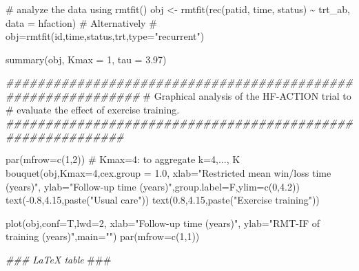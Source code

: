 \documentclass[
  letterpaper,
  DIV=11,
  numbers=noendperiod]{scrreprt}
\newenvironment{Shaded}{\begin{snugshade}}{\end{snugshade}}
\newcommand{\AlertTok}[1]{\textcolor[rgb]{0.68,0.00,0.00}{#1}}
\newcommand{\AttributeTok}[1]{\textcolor[rgb]{0.40,0.45,0.13}{#1}}
\newcommand{\CommentTok}[1]{\textcolor[rgb]{0.37,0.37,0.37}{#1}}
\newcommand{\DecValTok}[1]{\textcolor[rgb]{0.68,0.00,0.00}{#1}}
\newcommand{\DocumentationTok}[1]{\textcolor[rgb]{0.37,0.37,0.37}{\textit{#1}}}
\newcommand{\FloatTok}[1]{\textcolor[rgb]{0.68,0.00,0.00}{#1}}
\newcommand{\FunctionTok}[1]{\textcolor[rgb]{0.28,0.35,0.67}{#1}}
\newcommand{\NormalTok}[1]{\textcolor[rgb]{0.00,0.23,0.31}{#1}}
\newcommand{\OtherTok}[1]{\textcolor[rgb]{0.00,0.23,0.31}{#1}}
\newcommand{\SpecialCharTok}[1]{\textcolor[rgb]{0.37,0.37,0.37}{#1}}
\newcommand{\StringTok}[1]{\textcolor[rgb]{0.13,0.47,0.30}{#1}}
\begin{document}
\begin{Shaded}
\begin{Highlighting}[]
\CommentTok{\# analyze the data using rmtfit()}
\NormalTok{obj }\OtherTok{\textless{}{-}} \FunctionTok{rmtfit}\NormalTok{(}\FunctionTok{rec}\NormalTok{(patid, time, status) }\SpecialCharTok{\textasciitilde{}}\NormalTok{ trt\_ab, }\AttributeTok{data =}\NormalTok{ hfaction)}
\CommentTok{\# Alternatively}
\CommentTok{\# obj=rmtfit(id,time,status,trt,type="recurrent")}

\FunctionTok{summary}\NormalTok{(obj, }\AttributeTok{Kmax =} \DecValTok{1}\NormalTok{, }\AttributeTok{tau =} \FloatTok{3.97}\NormalTok{)}

\DocumentationTok{\#\#\#\#\#\#\#\#\#\#\#\#\#\#\#\#\#\#\#\#\#\#\#\#\#\#\#\#\#\#\#\#\#\#\#\#\#\#\#\#\#\#\#\#\#\#\#\#\#\#\#\#\#\#\#\#\#\#\#\#\#}
\CommentTok{\# Graphical analysis of the HF{-}ACTION trial to}
\CommentTok{\# evaluate the effect of exercise training.}
\DocumentationTok{\#\#\#\#\#\#\#\#\#\#\#\#\#\#\#\#\#\#\#\#\#\#\#\#\#\#\#\#\#\#\#\#\#\#\#\#\#\#\#\#\#\#\#\#\#\#\#\#\#\#\#\#\#\#\#\#\#\#\#}

\FunctionTok{par}\NormalTok{(}\AttributeTok{mfrow=}\FunctionTok{c}\NormalTok{(}\DecValTok{1}\NormalTok{,}\DecValTok{2}\NormalTok{))}
\CommentTok{\# Kmax=4: to aggregate k=4,..., K}
\FunctionTok{bouquet}\NormalTok{(obj,}\AttributeTok{Kmax=}\DecValTok{4}\NormalTok{,}\AttributeTok{cex.group =} \FloatTok{1.0}\NormalTok{,}
        \AttributeTok{xlab=}\StringTok{"Restricted mean win/loss time (years)"}\NormalTok{,}
        \AttributeTok{ylab=}\StringTok{"Follow{-}up time (years)"}\NormalTok{,}\AttributeTok{group.label=}\NormalTok{F,}\AttributeTok{ylim=}\FunctionTok{c}\NormalTok{(}\DecValTok{0}\NormalTok{,}\FloatTok{4.2}\NormalTok{))}
\FunctionTok{text}\NormalTok{(}\SpecialCharTok{{-}}\FloatTok{0.8}\NormalTok{,}\FloatTok{4.15}\NormalTok{,}\FunctionTok{paste}\NormalTok{(}\StringTok{"Usual care"}\NormalTok{))}
\FunctionTok{text}\NormalTok{(}\FloatTok{0.8}\NormalTok{,}\FloatTok{4.15}\NormalTok{,}\FunctionTok{paste}\NormalTok{(}\StringTok{"Exercise training"}\NormalTok{))}

\FunctionTok{plot}\NormalTok{(obj,}\AttributeTok{conf=}\NormalTok{T,}\AttributeTok{lwd=}\DecValTok{2}\NormalTok{, }\AttributeTok{xlab=}\StringTok{"Follow{-}up time (years)"}\NormalTok{,}
     \AttributeTok{ylab=}\StringTok{"RMT{-}IF of training (years)"}\NormalTok{,}\AttributeTok{main=}\StringTok{""}\NormalTok{)}
\FunctionTok{par}\NormalTok{(}\AttributeTok{mfrow=}\FunctionTok{c}\NormalTok{(}\DecValTok{1}\NormalTok{,}\DecValTok{1}\NormalTok{))}

\DocumentationTok{\#\#\# LaTeX table }\AlertTok{\#\#\#}


\end{Highlighting}
\end{Shaded}
\end{document}

